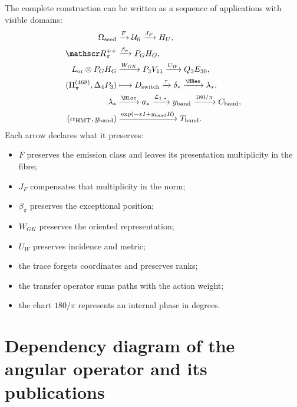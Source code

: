 The complete construction can be written as a sequence of applications
with visible domains:
\[
\begin{aligned}
\Omega_{\rm seed}
&\xrightarrow{F}\mathcal U_6
\xrightarrow{J_F}H_U,\\
\mathscr R_\pi^{++}
&\xrightarrow{\beta_\pi}P_GH_G,\\
L_{\rm or}\otimes P_GH_G
&\xrightarrow{W_{GK}}P_3V_{11}
\xrightarrow{U_W}Q_3E_{30},\\
(\Pi_\pi^{(468)},\Delta_4P_3)
&\longmapsto D_{\rm switch}
\xrightarrow{\tau}\delta_*
\xrightarrow{\rm \HRes}\lambda_*,\\
\lambda_*
&\xrightarrow{\rm \HLoc}a_*
\xrightarrow{\mathcal L_{1,*}}y_{\rm band}
\xrightarrow{180/\pi}C_{\rm band},\\
(\alpha_{\rm HMT},y_{\rm band})
&\xrightarrow{\exp(-xI+y_{\rm band}R)}T_{\rm band}.
\end{aligned}
\]
Each arrow declares what it preserves:
\begin{itemize}
  \item \(F\) preserves the emission class and leaves its presentation
  multiplicity in the fibre;
  \item \(J_F\) compensates that multiplicity in the norm;
  \item \(\beta_\pi\) preserves the exceptional position;
  \item \(W_{GK}\) preserves the oriented representation;
  \item \(U_W\) preserves incidence and metric;
  \item the trace forgets coordinates and preserves ranks;
  \item the transfer operator sums paths with the action weight;
  \item the chart \(180/\pi\) represents an internal phase in degrees.
\end{itemize}

\section{Dependency diagram of the angular operator and its publications}

